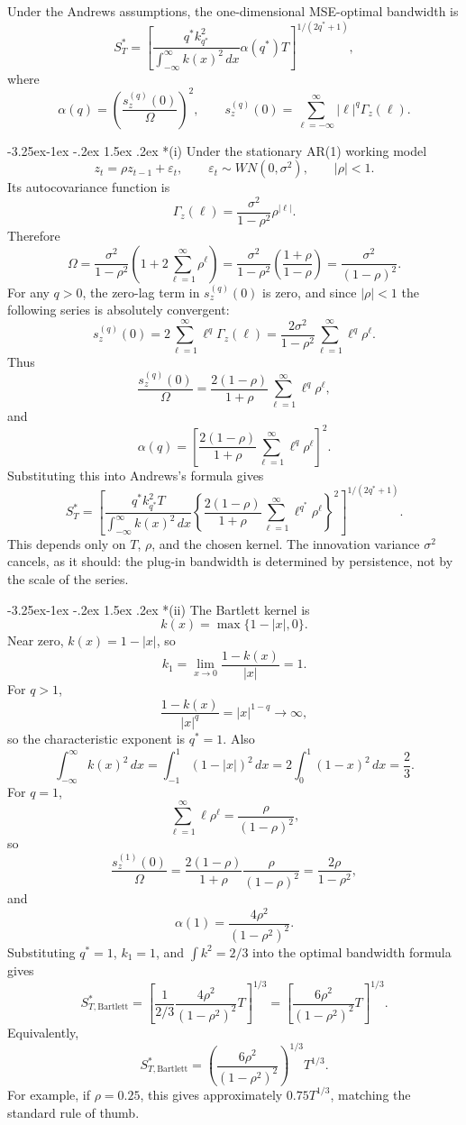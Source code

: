 \documentclass[11pt]{article}
\makeatletter
\renewcommand\subsection{\@startsection{subsection}{2}{\z@}%
  {-3.25ex\@plus -1ex \@minus -.2ex}%
  {1.5ex \@plus .2ex}%
  {\normalfont\large}}
\makeatother
\begin{document}
Under the Andrews assumptions, the one-dimensional MSE-optimal
bandwidth is
\[
S_T^*
=
\left[
\frac{q^* k_{q^*}^2}{\int_{-\infty}^{\infty} k(x)^2\,dx}
\alpha(q^*)T
\right]^{1/(2q^*+1)},
\]
where
\[
\alpha(q)=
\left(\frac{s_z^{(q)}(0)}{\Omega}\right)^2,
\qquad
s_z^{(q)}(0)=
\sum_{\ell=-\infty}^{\infty}|\ell|^q\Gamma_z(\ell).
\]

\subsection*{(i)}
Under the stationary AR(1) working model
\[
z_t=\rho z_{t-1}+\varepsilon_t,
\qquad
\varepsilon_t\sim WN(0,\sigma^2),
\qquad
|\rho|<1.
\]
Its autocovariance function is
\[
\Gamma_z(\ell)=\frac{\sigma^2}{1-\rho^2}\rho^{|\ell|}.
\]
Therefore
\[
\Omega
=
\frac{\sigma^2}{1-\rho^2}
\left(1+2\sum_{\ell=1}^{\infty}\rho^\ell\right)
=
\frac{\sigma^2}{1-\rho^2}
\left(\frac{1+\rho}{1-\rho}\right)
=
\frac{\sigma^2}{(1-\rho)^2}.
\]
For any \(q>0\), the zero-lag term in \(s_z^{(q)}(0)\) is zero, and since
\(|\rho|<1\) the following series is absolutely convergent:
\[
s_z^{(q)}(0)
=
2\sum_{\ell=1}^{\infty}\ell^q\Gamma_z(\ell)
=
\frac{2\sigma^2}{1-\rho^2}
\sum_{\ell=1}^{\infty}\ell^q\rho^\ell.
\]
Thus
\[
\frac{s_z^{(q)}(0)}{\Omega}
=
\frac{2(1-\rho)}{1+\rho}
\sum_{\ell=1}^{\infty}\ell^q\rho^\ell,
\]
and
\[
\alpha(q)
=
\left[
\frac{2(1-\rho)}{1+\rho}
\sum_{\ell=1}^{\infty}\ell^q\rho^\ell
\right]^2.
\]
Substituting this into Andrews's formula gives
\[
S_T^*
=
\left[
\frac{q^*k_{q^*}^2T}{\int_{-\infty}^{\infty} k(x)^2\,dx}
\left\{
\frac{2(1-\rho)}{1+\rho}
\sum_{\ell=1}^{\infty}\ell^{q^*}\rho^\ell
\right\}^2
\right]^{1/(2q^*+1)}.
\]
This depends only on \(T\), \(\rho\), and the chosen kernel. The innovation variance
\(\sigma^2\) cancels, as it should: the plug-in bandwidth is determined by persistence,
not by the scale of the series.

\subsection*{(ii)}
The Bartlett kernel is
\[
k(x)=\max\{1-|x|,0\}.
\]
Near zero, \(k(x)=1-|x|\), so
\[
k_1=\lim_{x\to 0}\frac{1-k(x)}{|x|}=1.
\]
For \(q>1\),
\[
\frac{1-k(x)}{|x|^q}=|x|^{1-q}\to\infty,
\]
so the characteristic exponent is \(q^*=1\). Also
\[
\int_{-\infty}^{\infty} k(x)^2\,dx
=
\int_{-1}^{1}(1-|x|)^2\,dx
=
2\int_0^1(1-x)^2\,dx
=
\frac{2}{3}.
\]
For \(q=1\),
\[
\sum_{\ell=1}^{\infty}\ell\rho^\ell
=
\frac{\rho}{(1-\rho)^2},
\]
so
\[
\frac{s_z^{(1)}(0)}{\Omega}
=
\frac{2(1-\rho)}{1+\rho}
\frac{\rho}{(1-\rho)^2}
=
\frac{2\rho}{1-\rho^2},
\]
and
\[
\alpha(1)=\frac{4\rho^2}{(1-\rho^2)^2}.
\]
Substituting \(q^*=1\), \(k_1=1\), and \(\int k^2=2/3\) into the optimal bandwidth
formula gives
\[
S_{T,\mathrm{Bartlett}}^*
=
\left[
\frac{1}{2/3}
\frac{4\rho^2}{(1-\rho^2)^2}T
\right]^{1/3}
=
\left[
\frac{6\rho^2}{(1-\rho^2)^2}T
\right]^{1/3}.
\]
Equivalently,
\[
S_{T,\mathrm{Bartlett}}^*
=
\left(\frac{6\rho^2}{(1-\rho^2)^2}\right)^{1/3}T^{1/3}.
\]
For example, if \(\rho=0.25\), this gives approximately \(0.75T^{1/3}\), matching the
standard rule of thumb.
\end{document}
